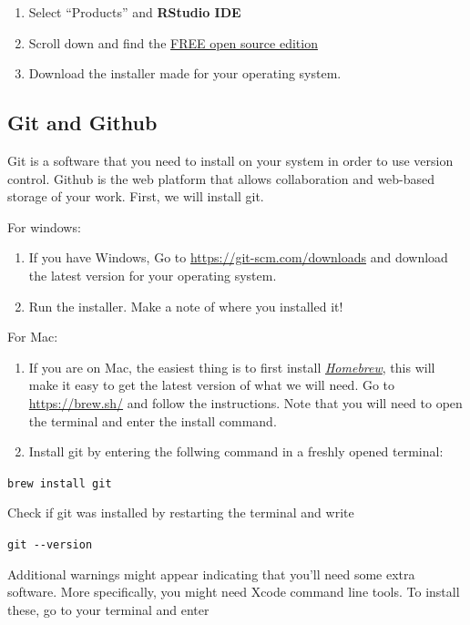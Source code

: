 \documentclass[
  11pt,
  letterpaper,
]{scrbook}
\providecommand{\tightlist}{%
  \setlength{\itemsep}{0pt}\setlength{\parskip}{0pt}}\usepackage{longtable,booktabs,array}
\begin{document}
\begin{enumerate}
\def\labelenumi{\arabic{enumi}.}
\tightlist
\item
  Select ``Products'' and \textbf{RStudio IDE}
\item
  Scroll down and find the \href{https://posit.co/downloads/}{FREE open
  source edition}
\item
  Download the installer made for your operating system.
\end{enumerate}

\hypertarget{git-and-github}{%
\subsection{Git and Github}\label{git-and-github}}

Git is a software that you need to install on your system in order to
use version control. Github is the web platform that allows
collaboration and web-based storage of your work. First, we will install
git.

For windows:

\begin{enumerate}
\def\labelenumi{\arabic{enumi}.}
\item
  If you have Windows, Go to \url{https://git-scm.com/downloads} and
  download the latest version for your operating system.
\item
  Run the installer. Make a note of where you installed it!
\end{enumerate}

For Mac:

\begin{enumerate}
\def\labelenumi{\arabic{enumi}.}
\item
  If you are on Mac, the easiest thing is to first install
  \href{https://brew.sh/}{\emph{Homebrew}}, this will make it easy to
  get the latest version of what we will need. Go to
  \url{https://brew.sh/} and follow the instructions. Note that you will
  need to open the terminal and enter the install command.
\item
  Install git by entering the follwing command in a freshly opened
  terminal:
\end{enumerate}

\texttt{brew\ install\ git}

Check if git was installed by restarting the terminal and write

\texttt{git\ -\/-version}

Additional warnings might appear indicating that you'll need some extra
software. More specifically, you might need Xcode command line tools. To
install these, go to your terminal and enter
\end{document}
